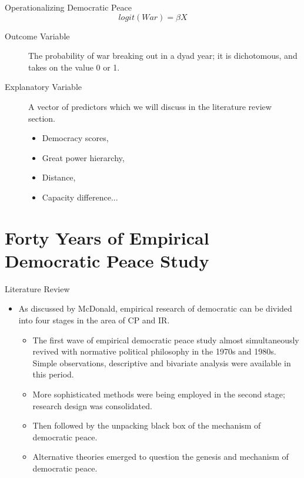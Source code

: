\documentclass{beamer}
\begin{document}
	\begin{frame}{Operationalizing Democratic Peace}
		\begin{equation}
			logit(War) = \beta X
		\end{equation}
		\begin{description}
			\item[Outcome Variable] The probability of war breaking out in a dyad year; it is dichotomous, and takes on the value 0 or 1.
			\item[Explanatory Variable] A vector of predictors which we will discuss in the literature review section.
			\begin{itemize}
				\item Democracy scores,
				\item Great power hierarchy,
				\item Distance,
				\item Capacity difference...
			\end{itemize}
		\end{description}
	\end{frame}

	\section{Forty Years of Empirical Democratic Peace Study}
	
	\begin{frame}{Literature Review}
		\begin{itemize}
			\item As discussed by McDonald, \autocite{mcdonaldGreatPowersHierarchy2015} empirical research of democratic can be divided into four stages in the area of CP and IR.
			\begin{itemize}
				\item The first wave of empirical democratic peace study almost simultaneously revived with normative political philosophy in the 1970s and 1980s. Simple observations, descriptive and bivariate analysis were available in this period.
				\item More sophisticated methods were being employed in the second stage; research design was consolidated.
				\item Then followed by the unpacking black box of the mechanism of democratic peace.
				\item Alternative theories emerged to question the genesis and mechanism of democratic peace.
			\end{itemize}
		\end{itemize}
	\end{frame}
	
\end{document}

